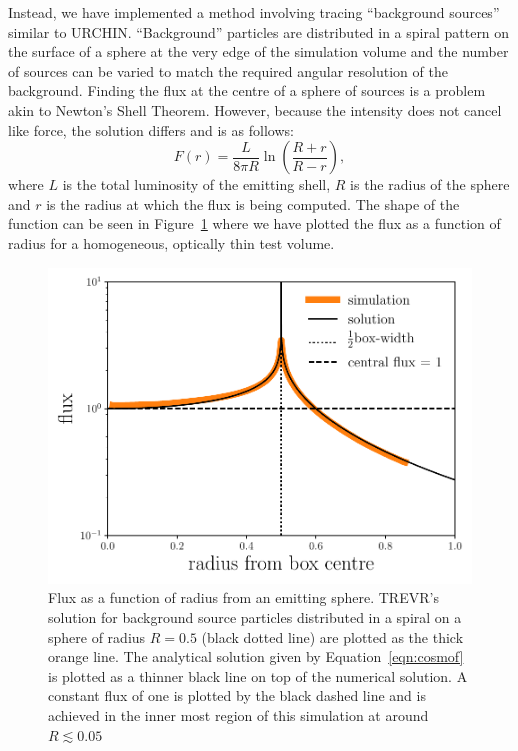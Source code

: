 \documentclass[fleq,usenatbib]{mnras}
\newcommand{\acro}{TREVR}
\begin{document}
{Instead, we have implemented a method involving tracing ``background sources'' 
similar to URCHIN. ``Background'' particles are distributed in a spiral 
pattern on the surface of a sphere at the very edge of the simulation volume 
and the number of sources can be varied 
to match the required angular resolution of the background. Finding the flux 
at the centre of a sphere of sources is a problem akin to Newton's Shell 
Theorem. However, because the intensity does not cancel like force, the 
solution differs and is as follows:
\begin{equation}
\label{eqn:cosmof}
F(r) = \frac{L}{8\pi R} \ln \left(\frac{R+r}{R-r}\right),
\end{equation}
where $L$ is the total luminosity of the emitting shell, $R$ is the radius of 
the sphere and $r$ is the radius at which the flux is being computed. The 
shape of the function can be seen in Figure~\ref{fig:cosmof} where we have 
plotted the flux as a function of radius for a homogeneous, optically thin 
test volume.
\begin{figure}
\includegraphics[width=1\linewidth]{Figures/cosmofield.pdf}
\caption{Flux as a function of radius from an emitting sphere. \acro{}'s 
solution for background source particles distributed in a spiral on a sphere 
of radius $R=0.5$ (black dotted line) are plotted as the thick orange line. 
The analytical solution given by Equation~\ref{eqn:cosmof} is plotted as a 
thinner black line on top of the numerical solution. A constant flux of one is 
plotted by the black dashed line and is achieved in the inner most region of 
this simulation at around $R \lesssim 0.05$}
\label{fig:cosmof}
\end{figure}

}
\end{document}
